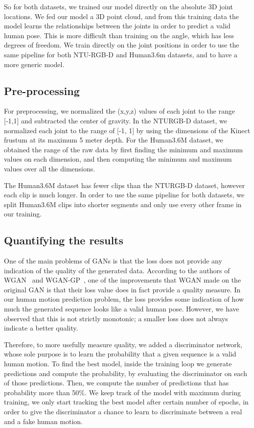 \documentclass[10pt,twocolumn,letterpaper]{article}
\begin{document}
So for both datasets, we trained our model directly on the absolute 3D joint locations. We fed our model a 3D point cloud, and from this training data the model learns the relationships between the joints in order to predict a valid human pose. This is more difficult than training on the angle, which has less degrees of freedom. We train directly on the joint positions in order to use the same pipeline for both NTU-RGB-D and Human3.6m datasets, and to have a more generic model.

\subsection{Pre-processing}

For preprocessing, we normalized the (x,y,z) values of each joint to the range [-1,1] and subtracted the center of gravity. In the NTURGB-D dataset, we normalized each joint to the range of [-1, 1] by using the dimensions of the Kinect frustum at its maximum 5 meter depth. For the Human3.6M dataset, we obtained the range of the raw data by first finding the minimum and maximum values on each dimension, and then computing the minimum and maximum values over all the dimensions.

The Human3.6M dataset has fewer clips than the NTURGB-D dataset, however each clip is much longer. In order to use the same pipeline for both datasets, we split Human3.6M clips into shorter segments and only use every other frame in our training.

\subsection{Quantifying the results}

One of the main problems of GANs is that the loss does not provide any indication of the quality of the generated data. According to the authors of WGAN~\cite{corr2017:Arjovsky} and WGAN-GP~\cite{corr2017:Ishaan}, one of the improvements that WGAN made on the original GAN is that their loss value does in fact provide a quality measure. In our human motion prediction problem, the loss provides some indication of how much the generated sequence looks like a valid human pose. However, we have observed that this is not strictly monotonic; a smaller loss does not always indicate a better quality.

Therefore, to more usefully measure quality, we added a discriminator network, whose sole purpose is to learn the probability that a given sequence is a valid human motion. To find the best model, inside the training loop we generate  predictions and compute the probability, by evaluating the discriminator on each of those predictions. Then, we compute the number of predictions  that has probability more than 50\%. We keep track of the model with maximum  during training, we only start tracking the best model after certain number of epochs, in order to give the discriminator a chance to learn to discriminate between a real and a fake human motion.  
\end{document}
